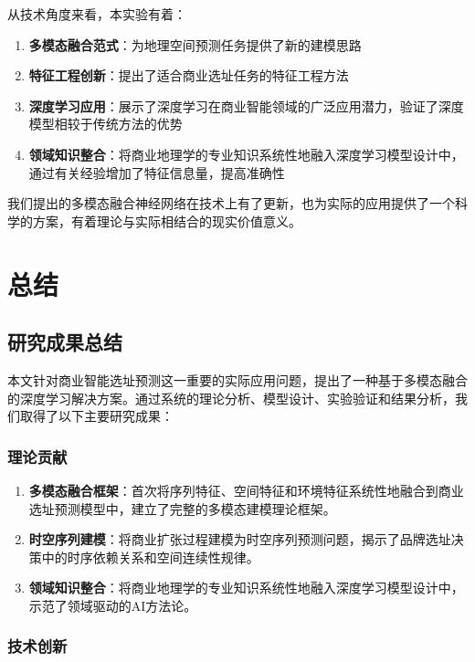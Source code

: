 \documentclass{article}
\begin{document}
从技术角度来看，本实验有着：

\begin{enumerate}
\item \textbf{多模态融合范式}：为地理空间预测任务提供了新的建模思路
\item \textbf{特征工程创新}：提出了适合商业选址任务的特征工程方法
\item \textbf{深度学习应用}：展示了深度学习在商业智能领域的广泛应用潜力，验证了深度模型相较于传统方法的优势
\item \textbf{领域知识整合}：将商业地理学的专业知识系统性地融入深度学习模型设计中，通过有关经验增加了特征信息量，提高准确性
\end{enumerate}

我们提出的多模态融合神经网络在技术上有了更新，也为实际的应用提供了一个科学的方案，有着理论与实际相结合的现实价值意义。

\section{总结}

\subsection{研究成果总结}

本文针对商业智能选址预测这一重要的实际应用问题，提出了一种基于多模态融合的深度学习解决方案。通过系统的理论分析、模型设计、实验验证和结果分析，我们取得了以下主要研究成果：

\subsubsection{理论贡献}

\begin{enumerate}
\item \textbf{多模态融合框架}：首次将序列特征、空间特征和环境特征系统性地融合到商业选址预测模型中，建立了完整的多模态建模理论框架。
\item \textbf{时空序列建模}：将商业扩张过程建模为时空序列预测问题，揭示了品牌选址决策中的时序依赖关系和空间连续性规律。
\item \textbf{领域知识整合}：将商业地理学的专业知识系统性地融入深度学习模型设计中，示范了领域驱动的AI方法论。
\end{enumerate}

\subsubsection{技术创新}
\end{document}
